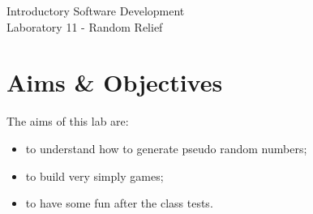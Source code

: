 \documentclass[12pt,oneside]{cttutorial}
\begin{document}
\tutorialextra{}


 

\newcommand{\xkcd}[2]{
	\begin{center}
	\texttt{[image: ../../Figures/png/\#1]}
	\newline
	\url{http://xkcd.com/#2}
	\end{center}
	\bigskip
}

\newcommand{\alert}[1]
{\marginpar
  {\makebox[0 pt][l]
    {\texttt{[image: ../../Figures/png/warning.png]}
  }
  \parbox{2 cm}{{\sffamily \bfseries \tiny #1}}}}


\renewcommand{\baselinestretch}{1.5}
\textwidth=15cm

\newcommand{\I}{j}

\begin{center}
\begin{bfseries}
Introductory Software Development\\Laboratory 11 - Random Relief
\end{bfseries}
\end{center}

\section{Aims \& Objectives}

The aims of this lab are:

\begin{itemize}
\item to understand how to generate pseudo random numbers;
\item to build very simply games;
\item to have some fun after the class tests.
\end{itemize}
\end{document}
